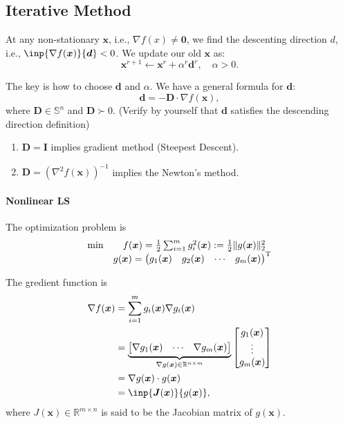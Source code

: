 \subsection{Iterative Method}
\begin{definition}
At any non-stationary $\bm x$, i.e., $\nabla f(x)\ne\bm0$, we find the descenting direction $d$, i.e., $\inp{\nabla f(\bm x)}{\bm d}<0$. We update our old $\bm x$ as:
\[
\bm x^{r+1}\leftarrow \bm x^r+\alpha^r\bm d^r,\quad \alpha>0.
\]
\end{definition}
The key is how to choose $\bm d$ and $\alpha$. We have a general formula for $\bm d$:
\[
\bm d = -\bm D\cdot\nabla f(\bm x),
\]
where $\bm D\in\mathbb{S}^n$ and $\bm D\succ0$. (Verify by yourself that $\bm d$ satisfies the descending direction definition)
\begin{enumerate}
\item
$\bm D=\bm I$ implies gradient method (Steepest Descent).
\item
$\bm D = \left(\nabla^2 f(\bm x)\right)^{-1}$ implies the Newton's method.
\end{enumerate}

\paragraph{Nonlinear LS} The optimization problem is
\[
\begin{array}{ll}
\min&\quad f(\bm x) = \frac{1}{2}\sum_{i=1}^mg_i^2(\bm x):=\frac{1}{2}\|g(\bm x)\|_2^2\\
&g(\bm x)=\begin{pmatrix}
g_1(\bm x)&g_2(\bm x)&\cdots&g_m(\bm x)
\end{pmatrix}^{\mathrm T}
\end{array}
\]

The gredient function is
\begin{align*}
\nabla f(\bm x)&=\sum_{i=1}^mg_i(\bm x)\nabla g_i(\bm x)\\
&=
\underbrace{\begin{bmatrix}
\nabla g_1(\bm x)&\cdots&\nabla g_m(\bm x)
\end{bmatrix}}_{\nabla g(\bm x)\in\mathbb{R}^{n\times m}}\begin{bmatrix}
g_1(\bm x)\\\vdots\\ g_m(\bm x)
\end{bmatrix}\\&=
\nabla g(\bm x)\cdot g(\bm x)\\
&=\inp{\bm J(\bm x)}{g(\bm x)},
\end{align*}
where $J(\bm x)\in\mathbb{R}^{m\times n}$ is said to be the Jacobian matrix of $g(\bm x)$.

